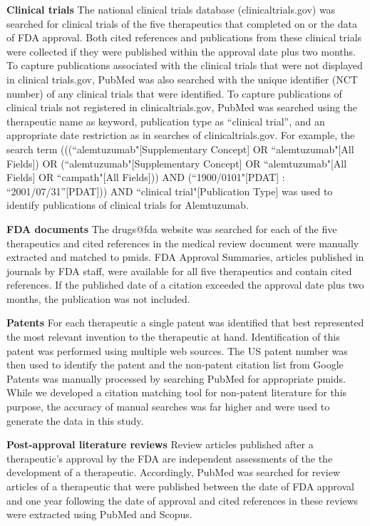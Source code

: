 \documentclass[10pt,letterpaper]{article}
\begin{document}
\textbf{Clinical trials} The national clinical trials database (clinicaltrials.gov) was searched for clinical trials of the five therapeutics that completed on or the data of FDA approval. Both cited references and publications from these clinical trials were collected if they were published within the approval date plus two months. To capture publications associated with the clinical trials that were not displayed in clinical trials.gov, PubMed was also searched with the unique identifier (NCT number) of any clinical trials that were identified. To capture publications of clinical trials not registered in clinicaltrials.gov, PubMed was searched using the therapeutic name as keyword, publication type as ``clinical trial'', and an appropriate date restriction as in searches of clinicaltrials.gov. For example, the search term (((``alemtuzumab"[Supplementary Concept] OR ``alemtuzumab"[All Fields]) OR (``alemtuzumab"[Supplementary Concept] OR ``alemtuzumab"[All Fields] OR ``campath"[All Fields])) AND (``1900/0101"[PDAT] : ``2001/07/31''[PDAT])) AND ``clinical trial"[Publication Type] was used to identify publications of clinical trials for Alemtuzumab.

\textbf{FDA documents} The drugs@fda website\cite{bib6} was searched for each of the five therapeutics and cited references in the medical review document were manually extracted and matched to pmids. FDA Approval Summaries, articles published in journals by FDA staff, were available for all five therapeutics and contain cited references. If the published date of a citation exceeded the approval date plus two months, the publication was not included.

\textbf{Patents} For each therapeutic a single patent was identified that best represented the most relevant invention to the therapeutic at hand. Identification of this patent was performed using multiple web sources. The US patent number was then used to identify the patent and the non-patent citation list from Google Patents \cite{bib8} was manually processed by searching PubMed for appropriate pmids. While we developed a citation matching tool for non-patent literature for this purpose, the accuracy of manual searches was far higher and were used to generate the data in this study.

\textbf{Post-approval literature reviews} Review articles published after a therapeutic's approval by the FDA are independent assessments of the the development of a therapeutic. Accordingly, PubMed was searched for review articles of a therapeutic that were published between the date of FDA approval and one year following the date of approval and cited references in these reviews were extracted using PubMed and Scopus.
\end{document}

